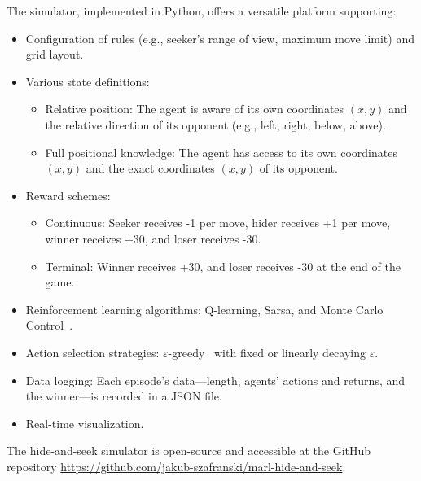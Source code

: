 \documentclass[runningheads]{llncs}
\begin{document}
The simulator, implemented in Python, offers a versatile platform supporting:
\begin{itemize}
    \item Configuration of rules (e.g., seeker’s range of view, maximum move limit) and grid layout.
    \item Various state definitions:
        \begin{itemize}[label=--]
            \item Relative position: The agent is aware of its own coordinates $(x, y)$ and the relative direction of its opponent (e.g., left, right, below, above).
            \item Full positional knowledge: The agent has access to its own coordinates $(x, y)$ and the exact coordinates $(x, y)$ of its opponent.
        \end{itemize}
    \item Reward schemes:
        \begin{itemize}[label=--]
            \item Continuous: Seeker receives -1 per move, hider receives +1 per move, winner receives +30, and loser receives -30.
            \item Terminal: Winner receives +30, and loser receives -30 at the end of the game.
        \end{itemize}
    \item Reinforcement learning algorithms: Q-learning, Sarsa, and Monte Carlo Control~\cite{ref_rlbook}.
    \item Action selection strategies: $\varepsilon$-greedy~\cite{ref_rlbook} with fixed or linearly decaying $\varepsilon$.
    \item Data logging: Each episode’s data—length, agents’ actions and returns, and the winner—is recorded in a JSON file.
    \item Real-time visualization. \end{itemize}

The hide-and-seek simulator is open-source and accessible at  the GitHub repository \url{https://github.com/jakub-szafranski/marl-hide-and-seek}.
\end{document}
